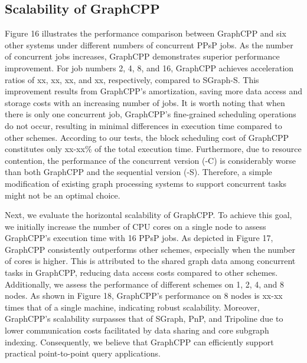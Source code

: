 \documentclass[lettersize,journal]{IEEEtran} %
\begin{document}
\subsection{Scalability of GraphCPP}
Figure 16 illustrates the performance comparison between GraphCPP and six other systems under different numbers of concurrent PPsP jobs. As the number of concurrent jobs increases, GraphCPP demonstrates superior performance improvement. For job numbers 2, 4, 8, and 16, GraphCPP achieves acceleration ratios of xx, xx, xx, and xx, respectively, compared to SGraph-S. This improvement results from GraphCPP's amortization, saving more data access and storage costs with an increasing number of jobs. It is worth noting that when there is only one concurrent job, GraphCPP's fine-grained scheduling operations do not occur, resulting in minimal differences in execution time compared to other schemes. According to our tests, the block scheduling cost of GraphCPP constitutes only xx-xx\% of the total execution time. Furthermore, due to resource contention, the performance of the concurrent version (-C) is considerably worse than both GraphCPP and the sequential version (-S). Therefore, a simple modification of existing graph processing systems to support concurrent tasks might not be an optimal choice.

Next, we evaluate the horizontal scalability of GraphCPP. To achieve this goal, we initially increase the number of CPU cores on a single node to assess GraphCPP's execution time with 16 PPsP jobs. As depicted in Figure 17, GraphCPP consistently outperforms other schemes, especially when the number of cores is higher. This is attributed to the shared graph data among concurrent tasks in GraphCPP, reducing data access costs compared to other schemes. Additionally, we assess the performance of different schemes on 1, 2, 4, and 8 nodes. As shown in Figure 18, GraphCPP's performance on 8 nodes is xx-xx times that of a single machine, indicating robust scalability. Moreover, GraphCPP's scalability surpasses that of SGraph, PnP, and Tripoline due to lower communication costs facilitated by data sharing and core subgraph indexing. Consequently, we believe that GraphCPP can efficiently support practical point-to-point query applications.
\end{document}
